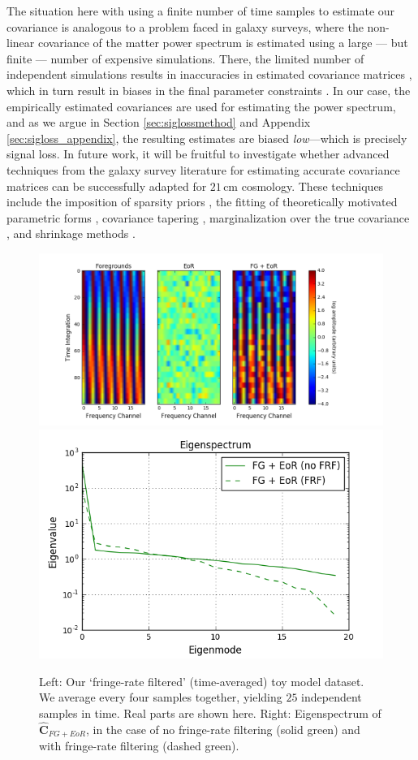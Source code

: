 \documentclass[preprint2,numberedappendix,tighten]{aastex6}  %
\begin{document}
The situation here with using a finite number of time samples to estimate our covariance is analogous to a problem faced in galaxy surveys, where the non-linear covariance 
of the matter power spectrum is estimated using a large --- but finite --- number of expensive simulations. There, the limited 
number of independent simulations results in inaccuracies in estimated covariance matrices 
\citep{dodelson_schneider2013,taylor_joachimi_etal2014}, which in turn result in biases in the final parameter constraints 
\citep{hartlap_et_al2007}. In our case, the empirically estimated covariances are used for estimating the power spectrum, and 
as we argue in Section \ref{sec:siglossmethod} and Appendix \ref{sec:sigloss_appendix}, the resulting estimates are biased 
\emph{low}---which is precisely signal loss. In future work, it will be fruitful to investigate whether advanced techniques from the 
galaxy survey literature for estimating accurate covariance matrices can be successfully adapted for $21\,\textrm{cm}$ 
cosmology. These techniques include the imposition of sparsity priors \citep{padmanabhan_et_al2016}, the fitting of 
theoretically motivated parametric forms \citep{pearson_samushia2016}, covariance tapering \citep{paz_sanchez2015}, 
marginalization over the true covariance \citep{sellentin_heavens2016}, and shrinkage methods 
\citep{pope_szapudi2008,joachimi_2017}.

\begin{figure}
	\centering
	\includegraphics[trim={1.5cm 0cm 1.5cm 0.3cm},clip,height=0.29\textwidth]{plots/toy_sigloss5.png}
	\includegraphics[trim={0.3cm 0cm 0.3cm 0.3cm},clip,height=0.29\textwidth]{plots/toy_sigloss15.png}
	\caption{Left: Our `fringe-rate filtered' (time-averaged) toy model dataset. We average every four samples together, 
yielding $25$ independent samples in time. Real parts are shown here. Right: Eigenspectrum of $\hat{\textbf{C}}_{FG+EoR}$, 
in the case of no fringe-rate filtering (solid green) and with fringe-rate filtering (dashed green).}
	\label{fig:toy_sigloss5}
\end{figure}
\end{document}

